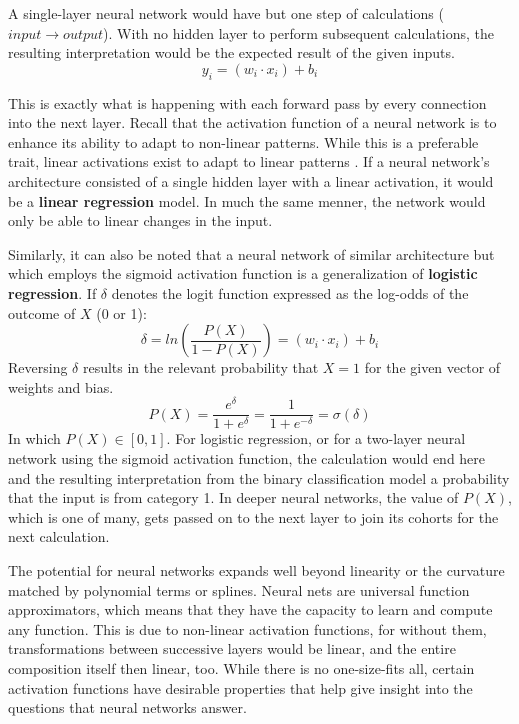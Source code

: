A single-layer neural network would have but one step of calculations ($input \rightarrow output$).  With no hidden layer to perform subsequent calculations, the resulting interpretation would be the expected result of the given inputs.
$$
y_i = (w_i \cdot x_i) + b_i
$$

This is exactly what is happening with each forward pass by every connection into the next layer.  Recall that the activation function of a neural network is to enhance its ability to adapt to non-linear patterns.  While this is a preferable trait, linear activations exist to adapt to linear patterns \cite{sharma2017activation}.  If a neural network's architecture consisted of a single hidden layer with a linear activation, it would be a \textbf{linear regression} model.  In much the same menner, the network would only be able to linear changes in the input.




Similarly, it can also be noted that a neural network of similar architecture but which employs the sigmoid activation function is a generalization of \textbf{logistic regression}. \cite{dreiseitl2002logistic} \cite{schumacher1996neural}  If $\delta$ denotes the logit function expressed as the log-odds of the outcome of $X$ (0 or 1):
$$
\delta = ln \left( \frac{P(X)}{1-P(X)} \right) = (w_i \cdot x_i) + b_i 
$$
Reversing $\delta$ results in the relevant probability that $X = 1$ for the given vector of weights and bias.
$$
P(X) = \frac{e^\delta}{1+e^\delta} = \frac{1}{1+e^{-\delta}} = \sigma(\delta)
$$
In which $P(X) \in [0,1]$.  For logistic regression, or for a two-layer neural network using the sigmoid activation function, the calculation would end here and the resulting interpretation from the binary classification model a probability that the input is from category 1.  In deeper neural networks, the value of $P(X)$, which is one of many, gets passed on to the next layer to join its cohorts for the next calculation.

The potential for neural networks expands well beyond linearity or the curvature matched by polynomial terms or splines.  Neural nets are universal function approximators, which means that they have the capacity to learn and compute any function. \cite{sharma2017activation} This is due to non-linear activation functions, for without them, transformations between successive layers would be linear, and the entire composition itself then linear, too. \cite{bishop1995}  While there is no one-size-fits all, certain activation functions have desirable properties that help give insight into the questions that neural networks answer.




